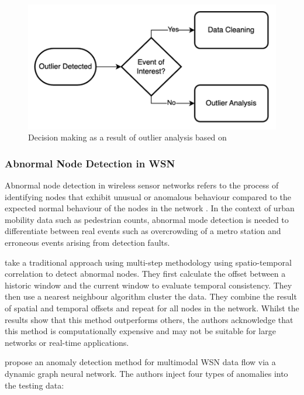\begin{figure}[h]
    \centering
    \includegraphics{figures/literature_review/outlier_decision_making.png}
    \caption{Decision making as a result of outlier analysis based on \cite{blazquez-garciaReviewOutlierAnomaly2021}}
    \label{fig:outlier_decision_making}
\end{figure}

\subsubsection{Abnormal Node Detection in WSN}
Abnormal node detection in wireless sensor networks refers to the process of identifying nodes that exhibit unusual or anomalous behaviour compared to the expected normal behaviour of the nodes in the network \citep{liNearestNeighborImputation2014}. In the context of urban mobility data such as pedestrian counts, abnormal mode detection is needed to differentiate between real events such as overcrowding of a metro station and erroneous events arising from detection faults.

\cite{chenFaultDetectionMethod2021} take a traditional approach using multi-step methodology using spatio-temporal correlation to detect abnormal nodes. They first calculate the offset between a historic window and the current window to evaluate temporal consistency. They then use a nearest neighbour algorithm cluster the data. They combine the result of spatial and temporal offsets and repeat for all nodes in the network. Whilst the results show that this method outperforms others, the authors acknowledge that this method is computationally expensive and may not be suitable for large networks or real-time applications.

\cite{zhangNovelAnomalyDetection2022} propose an anomaly detection method for multimodal WSN data flow via a dynamic graph neural network. The authors inject four types of anomalies into the testing data:

